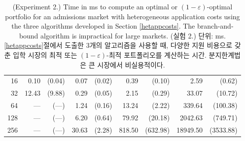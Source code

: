 \documentclass[11pt]{article} %
\theoremstyle{definition}
\theoremstyle{definition}
\begin{document}
\begin{table}[h!]
\begin{tabular}{r|r@{~}r|r@{~}r|r@{~}r|r@{~}r}
  16 &  0.10 & (0.04) &  0.07 & (0.02) &   0.39 &   (0.10) &     2.59 &    (0.62) \\
  32 & 12.43 & (9.88) &  0.29 & (0.05) &   2.15 &   (0.29) &    33.07 &   (10.72) \\
  64 &     — &    (—) &  1.24 & (0.16) &  13.24 &   (2.22) &   339.64 &  (100.38) \\
 128 &     — &    (—) &  6.20 & (0.64) &  79.92 &  (20.18) &  2042.63 &  (749.71) \\
 256 &     — &    (—) & 30.63 & (2.28) & 818.50 & (632.98) & 18949.50 & (3533.88)
\end{tabular}%
\caption{\label{experiment2results} \normalsize
\ifen (Experiment 2.) Time in ms to compute an optimal or $(1 - \varepsilon)$-optimal portfolio for an admissions market with heterogeneous application costs using the three algorithms developed in Section \ref{hetappcosts}.
The branch-and-bound algorithm is impractical for large markets. \lastptofcaption
\else  %
(실험 2.) 단위: ms. \ref{hetappcosts}절에서 도출한 3개의 알고리즘을 사용할 때, 다양한 지원 비용으로 갖춘 입학 시장의 최적 또는 $(1- \varepsilon)$-최적 포트폴리오를 계산하는 시간. 분지한계법은 큰 시장에서 비실용적이다. \lastptofcaption \fi}
\end{table}
\end{document}
